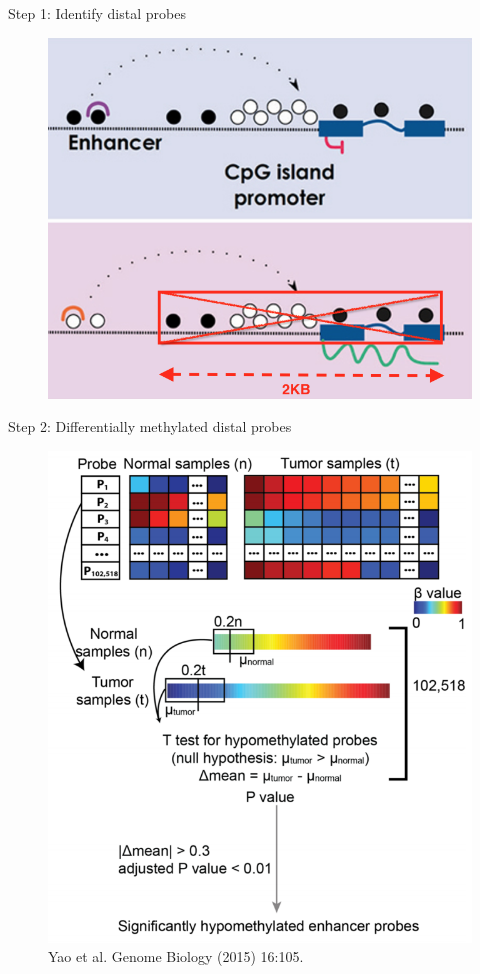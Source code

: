 \documentclass[slidestop,compress,11pt,xcolor=dvipsnames]{beamer}
\begin{document}




\begin{frame}{Step 1: Identify distal probes}
 \begin{figure}
  \centering
  \includegraphics[width=0.7\linewidth]{step1.png}
 \end{figure}
\end{frame}


\begin{frame}{Step 2: Differentially methylated distal probes}
 \vspace*{-0.3cm}
 \begin{figure}
  \centering
  \includegraphics[width=0.5\linewidth]{ELMER/diffmeth.png}{\tiny{\\Yao et al. Genome Biology (2015) 16:105.}}
 \end{figure}
\end{frame}
\end{document}
